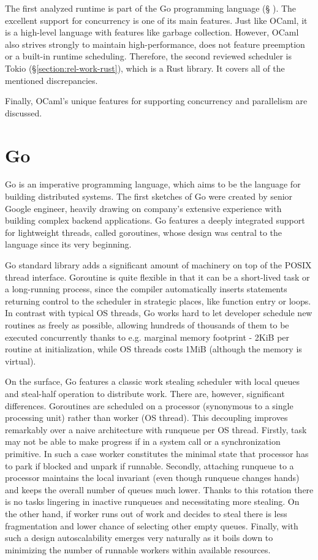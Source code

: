 \documentclass[12pt,a4paper,twoside]{report}
\begin{document}
The first analyzed runtime is part of the Go programming language (\S
\label{section:rel-work-go}). The excellent support for concurrency is one of its main features. Just like OCaml, it is a high-level language with features like garbage collection. However, OCaml also strives strongly to maintain high-performance, does not feature preemption or a built-in runtime scheduling. Therefore, the second reviewed scheduler is Tokio (\S\ref{section:rel-work-rust}), which is a Rust library. It covers all of the mentioned discrepancies.

Finally, OCaml's unique features for supporting concurrency and parallelism are discussed. 

\section{Go}
\label{section:rel-work-go}
Go is an imperative programming language, which aims to be the language for building distributed systems. The first sketches of Go were created by senior Google engineer, heavily drawing on company's extensive experience with building complex backend applications. Go features a deeply integrated support for lightweight threads, called goroutines, whose design was central to the language since its very beginning.

Go standard library adds a significant amount of machinery on top of the POSIX thread interface. Goroutine is quite flexible in that it can be a short-lived task or a long-running process, since the compiler automatically inserts statements returning control to the scheduler in strategic places, like function entry or loops. In contrast with typical OS threads, Go works hard to let developer schedule new routines as freely as possible, allowing hundreds of thousands of them to be executed concurrently thanks to e.g. marginal memory footprint - 2KiB per routine at initialization, while OS threads costs 1MiB (although the memory is virtual). 

On the surface, Go features a classic work stealing scheduler with local queues and steal-half operation to distribute work. There are, however, significant differences. Goroutines are scheduled on a processor (synonymous to a single processing unit) rather than worker (OS thread). This decoupling improves remarkably over a naive architecture with runqueue per OS thread. Firstly, task may not be able to make progress if in a system call or a synchronization primitive. In such a case worker constitutes the minimal state that processor has to park if blocked and unpark if runnable. Secondly, attaching runqueue to a processor maintains the local invariant (even though runqueue changes hands) and keeps the overall number of queues much lower. Thanks to this rotation there is no tasks lingering in inactive runqueues and necessitating more stealing. On the other hand, if worker runs out of work and decides to steal there is less fragmentation and lower chance of selecting other empty queues. Finally, with such a design autoscalability emerges very naturally as it boils down to minimizing the number of runnable workers within available resources. 
\end{document}
